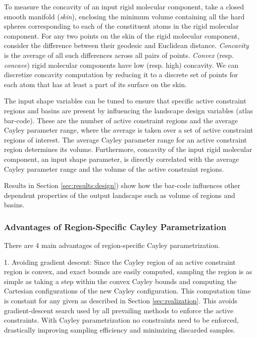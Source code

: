 \documentclass[]{article}
\newcommand{\rmc}{rigid molecular component}
\begin{document}
To measure the concavity of an input \rmc, take a closed smooth manifold
(\emph{skin}), enclosing the minimum volume containing all the hard spheres
corresponding to each of the constituent atoms in the \rmc. For any two
points on the skin of the \rmc, consider the difference between their geodesic
and Euclidean distance. \emph{Concavity} is the average of all such differences
across all pairs of points. \emph{Convex} (resp. \emph{concave}) \rmc s have
low (resp. high) concavity. We can discretize concavity computation by
reducing it to a discrete set of points for each atom that has at least a part
of its surface on the skin.

The input shape variables can be tuned to ensure that specific active
constraint regions and basins are present by influencing the landscape design
variables (atlas bar-code). These are the number of active constraint regions
and the average Cayley parameter range, where the average
is taken over a set of active constraint regions of interest.  The average
Cayley parameter range for an active constraint region determines its volume.
Furthermore, concavity of the input \rmc, an input shape parameter, is directly
correlated with the average Cayley parameter range and the volume of the active
constraint regions. 

Results in Section \ref{sec:results:design}) show how the bar-code influences
other dependent properties of the output landscape such as volume of regions
and basins. 



\subsubsection{Advantages of Region-Specific Cayley Parametrization}
\label{sec:boundaryDetection}
There are 4 main advantages of region-specific Cayley parametrization.

1. Avoiding gradient descent: Since the Cayley region of an active constraint
region is convex, and exact bounds are easily computed, sampling the region
is as simple as taking a step within the convex Cayley bounds and computing the
Cartesian configurations of the new Cayley configuration. This computation
time is constant for any given  as described in Section
\ref{sec:realization}. This avoids gradient-descent search used by all
prevailing methods to enforce the active constraints. With Cayley
parametrization no constraints need to be enforced, drastically improving
sampling efficiency and minimizing discarded samples.
\end{document}
